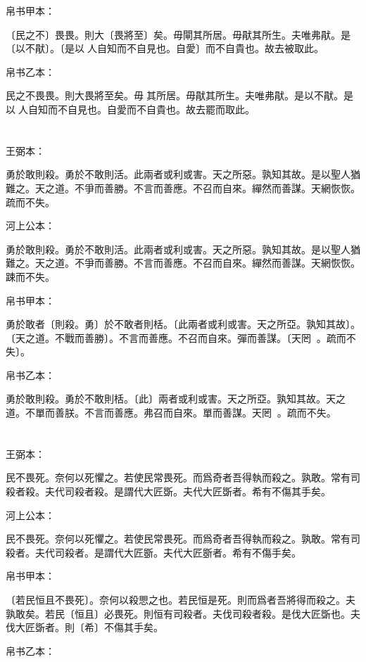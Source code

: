 \documentclass[a5paper]{ctexbook}
\begin{document}
    帛书甲本：

    〔民之不〕畏畏。則大〔畏將至〕矣。毋閘其所居。毋猒其所生。夫唯弗猒。是〔以不猒〕。〔是以𦔻人自知而不自見也。自愛〕而不自貴也。故去被取此。

    帛书乙本：

    民之不畏畏。則大畏將至矣。毋𠇺其所居。毋猒其所生。夫唯弗猒。是以不猒。是以𦔻人自知而不自見也。自愛而不自貴也。故去罷而取此。

    \chapter{}
    王弼本：

    勇於敢則殺。勇於不敢則活。此兩者或利或害。天之所惡。孰知其故。是以聖人猶難之。天之道。不爭而善勝。不言而善應。不召而自來。繟然而善謀。天網恢恢。疏而不失。

    河上公本：

    勇於敢則殺。勇於不敢則活。此兩者或利或害。天之所惡。孰知其故。是以聖人猶難之。天之道。不爭而善勝。不言而善應。不召而自來。繟然而善謀。天網恢恢。踈而不失。

    帛书甲本：

    勇於敢者〔則殺。勇〕於不敢者則栝。〔此兩者或利或害。天之所亞。孰知其故〕。〔天之道。不戰而善勝〕。不言而善應。不召而自來。彈而善謀。〔天罔𧙔𧙔。疏而不失〕。

    帛书乙本：

    勇於敢則殺。勇於不敢則栝。〔此〕兩者或利或害。天之所亞。孰知其故。天之道。不單而善朕。不言而善應。弗召而自來。單而善謀。天罔𧙔𧙔。疏而不失。

    \chapter{}
    王弼本：

    民不畏死。奈何以死懼之。若使民常畏死。而爲奇者吾得執而殺之。孰敢。常有司殺者殺。夫代司殺者殺。是謂代大匠斲。夫代大匠斲者。希有不傷其手矣。

    河上公本：

    民不畏死。奈何以死懼之。若使民常畏死。而爲奇者吾得執而殺之。孰敢。常有司殺者。夫代司殺者。是謂代大匠斵。夫代大匠斵者。希有不傷手矣。

    帛书甲本：

    〔若民恒且不畏死〕。奈何以殺愳之也。若民恒是死。則而爲者吾將得而殺之。夫孰敢矣。若民〔恒且〕必畏死。則恒有司殺者。夫伐司殺者殺。是伐大匠斲也。夫伐大匠斲者。則〔希〕不傷其手矣。

    帛书乙本：
\end{document}
